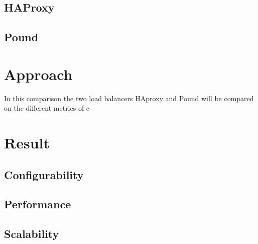 \subsection{HAProxy}

\subsection{Pound}

\section{Approach}
In this comparison the two load balancers HAproxy and Pound will be compared on
the different metrics of c


\section{Result}

%
\subsection{Configurability}

\subsection{Performance}

\subsection{Scalability}



